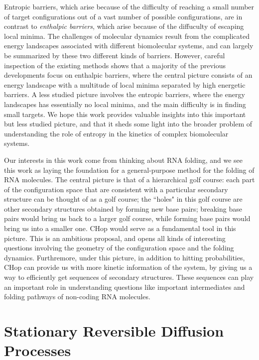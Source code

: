 \documentclass[english, aip, jcp, priprint, graphicx,floatfix]{revtex4-1}
\theoremstyle{plain}
\theoremstyle{definition}
\theoremstyle{plain}
\begin{document}
Entropic barriers, which arise because of the difficulty of reaching a small number of target configurations out of a vast number of possible configurations, are in contrast to \emph{enthalpic barriers}, which arise because of the diffuculty of escaping local minima. The challenges of molecular dynamics result from the complicated energy landscapes associated with different biomolecular systems, and can largely be summarized by these two different kinds of barriers. However, careful inspection of the existing methods shows that a majority of the previous developments focus on enthalpic barriers, where the central picture consists of an energy landscape with a multitude of local minima separated by high energetic barriers. A less studied picture involves the entropic barriers, where the energy landscapes has essentially no local minima, and the main difficulty is in finding small targets. We hope this work provides valuable insights into this important but less studied picture, and that it sheds some light into the broader problem of understanding the role of entropy in the kinetics of complex biomolecular systems. 

Our interests in this work come from thinking about RNA folding, and we see this work as laying the foundation for a general-purpose method for the folding of RNA molecules. The central picture is that of a hierarchical golf course: each part of the configuration space that are consistent with a particular secondary structure can be thought of as a golf course; the ``holes" in this golf course are other secondary structures obtained by forming new base pairs; breaking base pairs would bring us back to a larger golf course, while forming base pairs would bring us into a smaller one. CHop would serve as a fundamental tool in this picture. This is an ambitious proposal, and opens all kinds of interesting questions involving the geometry of the configuration space and the folding dynamics. Furthremore, under this picture, in addition to hitting probabilities, CHop can provide us with more kinetic information of the system, by giving us a way to efficiently get sequences of secondary structures. These sequences can play an important role in understanding questions like important intermediates and folding pathways of non-coding RNA molecules.

\newpage

\appendix

\section{Stationary Reversible Diffusion Processes}\label{sec:reversible_diffusion}
\end{document}
